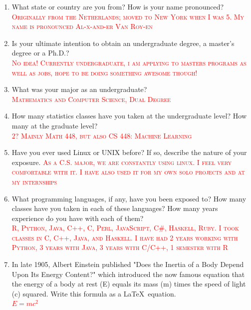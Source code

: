 \documentclass[12pt]{article}
\newcommand{\fillin}[1]{\textcolor{red}{\textsc{#1}}}
\begin{document}
\begin{enumerate}
\item What state or country are you from?  How is your name pronounced?\\
\fillin{Originally from the Netherlands; moved to New York when I was 5. My name is pronounced Al-x-and-er Van Roy-en}
\item Is your ultimate intention to obtain an undergraduate degree, a master's degree or a Ph.D.?\\
\fillin{No idea! Currently undergraduate, i am applying to masters programs as well as jobs, hope to be doing something awesome though!}
\item What was your major as an undergraduate?\\
\fillin{Mathematics and Computer Science, Dual Degree}
\item How many statistics classes have you taken at the undergraduate level?  How many at the graduate level?\\
\fillin{2? Mainly Math 448, but also CS 448: Machine Learning}
\item Have you ever used Linux or UNIX before?  If so, describe the nature of your exposure.
\fillin{As a C.S. major, we are constantly using linux. I feel very comfortable with it. I have also used it for my own solo projects and at my internships}
\item What programming languages, if any, have you been exposed to?  How many classes have you taken in each of these languages?  How many years experience do you have with each of them?\\
\fillin{R, Python, Java, C++, C, Perl,  JavaScript, C\#, Haskell, Ruby. I took classes in C, C++, Java, and Haskell. I have had 2 years working with Python, 3 years with Java, 3 years with C/C++, 1 semester with R}
\item In late 1905, Albert Einstein published "Does the Inertia of a Body Depend Upon Its Energy Content?" which introduced the now famous equation that the energy of a body at rest (E) equals its mass (m) times the speed of light (c) squared.  Write this formula as a \LaTeX\ equation.\\
\fillin{$E=mc^2$}
\end{enumerate}
\end{document}
